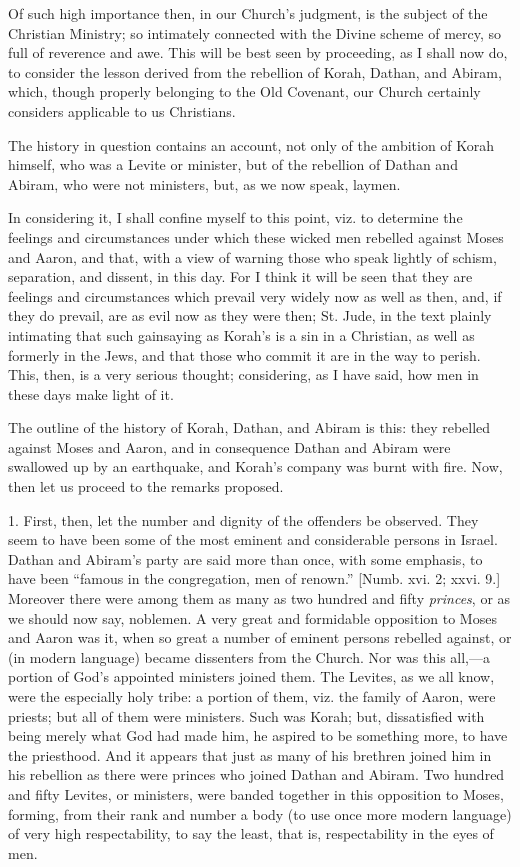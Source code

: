 Of such high importance then, in our Church's judgment, is the
subject of the Christian Ministry; so intimately connected with the
Divine scheme of mercy, so full of reverence and awe. This will be
best seen by proceeding, as I shall now do, to consider the lesson
derived from the rebellion of Korah, Dathan, and Abiram, which, though
properly belonging to the Old Covenant, our Church certainly considers
applicable to us Christians.

The history in question contains an account, not only of the
ambition of Korah himself, who was a Levite or minister, but of the
rebellion of Dathan and Abiram, who were not ministers, but, as we now
speak, laymen.

In considering it, I shall confine myself to this point, viz. to
determine the feelings and circumstances under which these wicked men
rebelled against Moses and Aaron, and that, with a view of warning
those who speak lightly of schism, separation, and dissent, in this
day. For I think it will be seen that they are feelings and
circumstances which prevail very widely now as well as then, and, if
they do prevail, are as evil now as they were then; St. Jude, in the
text plainly intimating that such gainsaying as Korah's is a sin in a
Christian, as well as formerly in the Jews, and that those who commit
it are in the way to perish. This, then, is a very serious thought;
considering, as I have said, how men in these days make light of it.

The outline of the history of Korah, Dathan, and Abiram is this:
they rebelled against Moses and Aaron, and in consequence Dathan and
Abiram were swallowed up by an earthquake, and Korah's company was
burnt with fire. Now, then let us proceed to the remarks proposed.

1. First, then, let the number and dignity of the offenders be
observed. They seem to have been some of the most eminent and
considerable persons in Israel. Dathan and Abiram's party are said
more than once, with some emphasis, to have been ``famous in the
congregation, men of renown.'' [Numb. xvi. 2; xxvi. 9.] Moreover
there were among them as many as two hundred and fifty \emph{princes},
or as we should now say, noblemen. A very great and formidable
opposition to Moses and Aaron was it, when so great a number of
eminent persons rebelled against, or (in modern language) became
dissenters from the Church. Nor was this all,—a portion of God's
appointed ministers joined them. The Levites, as we all know, were the
especially holy tribe: a portion of them, viz. the family of Aaron,
were priests; but all of them were ministers. Such was Korah; but,
dissatisfied with being merely what God had made him, he aspired to be
something more, to have the priesthood. And it appears that just as
many of his brethren joined him in his rebellion as there were princes
who joined Dathan and Abiram. Two hundred and fifty Levites, or
ministers, were banded together in this opposition to Moses, forming,
from their rank and number a body (to use once more modern language)
of very high respectability, to say the least, that is, respectability
in the eyes of men.

